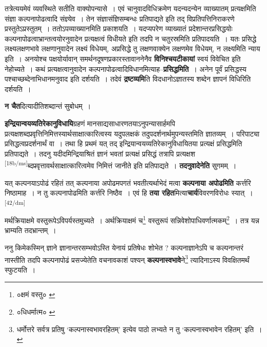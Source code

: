 \documentclass[article,12pt,a4paper]{memoir}
\begin{document}
	  \pstart तत्रेत्ययमेवं व्यवस्थिते सतीति वाक्योपन्यासे । एवं चानुवादविधिक्रमेण यदन्यदन्येन व्याख्यातम् प्रत्यक्षमिति संज्ञा कल्पनापोढत्वादि संज्ञ्येव । तेन संज्ञासंज्ञिसम्बन्धः प्रतिपाद्यते इति तद् विप्रतिपत्तिनिराकरणे प्रस्तुतेऽप्रस्तुतम् । ततोऽपव्याख्यानमिति प्रकाशयति । यदप्यपरेण व्याख्यातं प्रदेशान्तरप्रसिद्धयोः कल्पनापोढत्वाभ्रान्तत्वयोरनुवादेन प्रत्यक्षत्वं विधीयते इति तदपि न चतुरस्रमिति प्रतिपादयति । यतः प्रसिद्धे लक्ष्यलक्षणभावे लक्षणानुवादेन लक्ष्यं विधेयम्, अप्रसिद्धे तु लक्षणवाक्येन लक्षणमेव विधेयम्, न लक्ष्यमिति न्याय इति । अनयोश्च पक्षयोर्यावान् समर्थनदूषणप्रकारस्तावाननेनैव \textbf{विनिश्चयटीकायां} स्वयं विवेचित इति नेहोच्यते । कथं प्रत्यक्षत्वानुवादेन कल्पनापोढत्वादिविधानमित्याह--\textbf{प्रसिद्धमिति} । अनेन पूर्वं प्रसिद्धस्य पश्चाच्छब्देनाभिधानमनुवाद इति दर्शयति । तदेवं \textbf{द्रष्टव्यमि}ति विदधानोऽज्ञातस्य शब्देन ज्ञापनं विधिरिति दर्शयति ।
	\pend
      

	  \pstart \textbf{न चैत}दित्यादीतिशब्दान्तं सुबोधम् ।
	\pend
      

	  \pstart \textbf{इन्द्रियान्वयव्यतिरेकानुविधायि}ग्रहणं मानसाद्यसाधारणतयाऽनुपन्यासार्हमपि प्रत्यक्षशब्दप्रवृत्तिनिमित्तस्यार्थसाक्षात्कारित्वस्य यदुपलक्षकं तदुपदर्शनार्थमुपन्यस्तमिति ज्ञातव्यम् । परिपाट्या प्रसिद्धत्वप्रदर्शनार्थं वा । तथा हि प्रथमं यत् तद् इन्द्रियान्वयव्यतिरेकानुविधायितया प्रत्यक्षं प्रसिद्धमिति प्रतिपाद्यते । तदनु यदीदमिन्द्रियाश्रितं ज्ञानं भवतां प्रत्यक्षं प्रसिद्धं तत्रापि प्रत्यक्षश \leavevmode\textsuperscript{\rmlatinfont\tiny [18b/ms]}ब्दप्रवृत्तावर्थसाक्षात्कारित्वमेव निमित्तं जानीते इति प्रतिपाद्यते । \textbf{तदनुवादेनेति} सुगमम् ।
	\pend
      

	  \pstart यत् कल्पनयाऽपोढं रहितं तत् कल्पनाया अपोढमपगतं भवतीत्यर्थाभेदं मत्वा \textbf{कल्पनाया अपोढमिति} कर्त्तरि निष्ठामाह । न तु कल्पनापोढमिति कर्त्तरि निष्ठैव । एवं हि \textbf{तया रहित}मित्या\textbf{चार्य}विवरणविरोधः स्यात् ।
	\pend
      \leavevmode\textsuperscript{\rmlatinfont\tiny [42/dm]}

	  \pstart मर्थक्रियाक्षमे वस्तुरूपेऽविपर्यस्तमुच्यते । अर्थक्रियाक्षमं च\footnote{०क्षमं वस्तु० \cite{dp-msA} \cite{dp-edP} \cite{dp-edE}} वस्तुरूपं सन्निवेशोपाधिवर्णात्मकम्\footnote{०धिधर्मात्म० \cite{dp-edP} \cite{dp-edH}} । तत्र यन्न भ्राम्यति तदभ्रान्तम् ।
	\pend
      

	  \pstart ननु किमेकस्मिन् ज्ञाने ज्ञानान्तरसम्भवोऽस्ति येनायं प्रतिषेधः शोभेत ? कल्पनाज्ञानेऽपि च कल्पनान्तरं नास्तीति तदपि कल्पनापोढं प्रसज्येतेति वचनावकाशं पश्यन् \textbf{कल्पनास्वभावे}ने\footnote{धर्मोत्तरे सर्वत्र प्रतिषु ‘कल्पनास्वभावरहितम्’ इत्येव पाठो लभ्यते न तु ‘कल्पनास्वभावेन रहितम्’ इति ।} त्यादिनाऽस्य विवक्षितमर्थं स्फुटयति ।
	\pend
      
\end{document}
